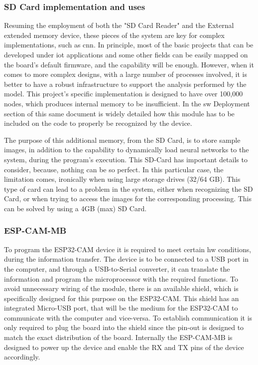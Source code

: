 \bigskip

\subsubsection{SD Card implementation and uses}

Resuming the employment of both the "SD Card Reader" and the External extended memory device, these pieces of the system are key for complex implementations, such as \ac{cnn}. In principle, most of the basic projects that can be developed under \ac{iot} applications and some other fields can be easily mapped on the board's default firmware, and the capability will be enough. However, when it comes to more complex designs, with a large number of processes involved, it is better to have a robust infrastructure to support the analysis performed by the model. This project's specific implementation is designed to have over 100,000 nodes, which produces internal memory to be insufficient. In the \ac{sw} Deployment section of this same document is widely detailed how this module has to be included on the code to properly be recognized by the device. 

The purpose of this additional memory, from the SD Card, is to store sample images, in addition to the capability to dynamically load neural networks to the system, during the program's execution. \cite{Kontis:2017} This SD-Card has important details to consider, because, nothing can be so perfect. In this particular case, the limitation comes, ironically when using large storage drives (32/64 GB). This type of card can lead to a problem in the system, either when recognizing the SD Card, or when trying to access the images for the corresponding processing. This can be solved by using a 4GB (max) SD Card. \\

\subsubsection{ESP-CAM-MB}

To program the ESP32-CAM device it is required to meet certain \ac{hw} conditions, during the information transfer. 
The device is to be connected to a USB port in the computer, and through a USB-to-Serial converter, it can translate the information and program the microprocessor with the required functions. To avoid unnecessary wiring of the module, there is an available shield, which is specifically designed for this purpose on the ESP32-CAM. This shield has an integrated Micro-USB port, that will be the medium for the ESP32-CAM to communicate with the computer and vice-versa. To establish communication it is only required to plug the board into the shield since the pin-out is designed to match the exact distribution of the board. Internally the ESP-CAM-MB is designed to power up the device and enable the RX and TX pins of the device accordingly. 

